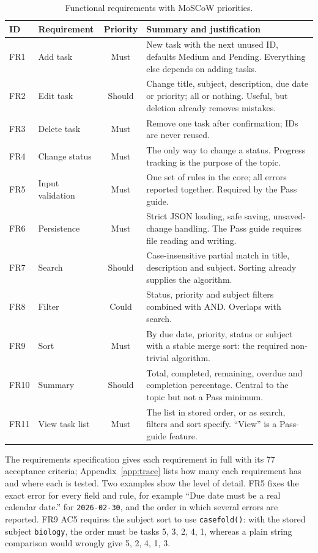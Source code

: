\documentclass[11pt,a4paper]{article}
\newcommand{\code}[1]{\texttt{#1}}
\begin{document}
\begin{table}[ht]
\centering
\small
\begin{tabularx}{\textwidth}{@{}llcX@{}}
\toprule
ID & Requirement & Priority & Summary and justification \\
\midrule
FR1 & Add task & Must & New task with the next unused ID, defaults Medium and Pending. Everything else depends on adding tasks. \\
FR2 & Edit task & Should & Change title, subject, description, due date or priority; all or nothing. Useful, but deletion already removes mistakes. \\
FR3 & Delete task & Must & Remove one task after confirmation; IDs are never reused. \\
FR4 & Change status & Must & The only way to change a status. Progress tracking is the purpose of the topic. \\
FR5 & Input validation & Must & One set of rules in the core; all errors reported together. Required by the Pass guide. \\
FR6 & Persistence & Must & Strict JSON loading, safe saving, unsaved-change handling. The Pass guide requires file reading and writing. \\
FR7 & Search & Should & Case-insensitive partial match in title, description and subject. Sorting already supplies the algorithm. \\
FR8 & Filter & Could & Status, priority and subject filters combined with AND. Overlaps with search. \\
FR9 & Sort & Must & By due date, priority, status or subject with a stable merge sort: the required non-trivial algorithm. \\
FR10 & Summary & Should & Total, completed, remaining, overdue and completion percentage. Central to the topic but not a Pass minimum. \\
FR11 & View task list & Must & The list in stored order, or as search, filters and sort specify. \enquote{View} is a Pass-guide feature. \\
\bottomrule
\end{tabularx}
\caption{Functional requirements with MoSCoW priorities.}
\label{tab:fr}
\end{table}

The requirements specification gives each requirement in full with its
77 acceptance criteria; Appendix~\ref{app:trace} lists how many each
requirement has and where each is tested. Two examples show the level of
detail. FR5 fixes the
exact error for every field and rule, for example
\enquote{Due date must be a real calendar date.} for \code{2026-02-30}, and
the order in which several errors are reported. FR9 AC5 requires the subject
sort to use \code{casefold()}: with the stored subject \code{biology}, the
order must be tasks 5, 3, 2, 4, 1, whereas a plain string comparison would
wrongly give 5, 2, 4, 1, 3.
\end{document}
